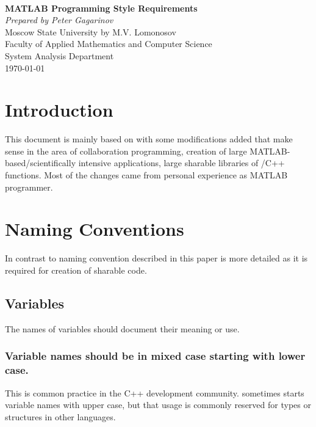 \documentclass[titlepage,a4paper,12pt]{article}
\begin{document}
\begin{titlepage}
\begin{flushright}
\indent\vspace{4cm}\\
\Huge{\textbf{MATLAB Programming Style Requirements}}\\
\vspace{3cm} \Large{\textit{Prepared by Peter Gagarinov}}\\
\vspace{3cm} \large{Moscow State University by M.V. Lomonosov}\\
\vspace{1cm} \large{Faculty of Applied Mathematics and Computer Science}\\
\vspace{1cm} \large{System Analysis Department}\\
\vspace{3cm} \large{\today}
\end{flushright}
\end{titlepage}

\section{Introduction}
This document is mainly based on \cite{MPS_G} with some
modifications added that make sense in the area of
collaboration programming, creation of large MATLAB-based/scientifically intensive applications,
large sharable libraries of
/C++ functions. Most of the changes came from personal
experience as MATLAB programmer.
\section{ Naming Conventions}
In contrast to \cite{MPS_G} naming convention described in this paper
is more detailed as it is required for creation of sharable code.
\subsection{Variables}
 The names of variables should document their
meaning or use.
\subsubsection{Variable names should be in mixed
case starting with lower case.}
 This is common practice in the C++
development community. \TMW sometimes starts variable names with
upper case, but that usage is commonly reserved for types or
structures in other languages.
\end{document}
